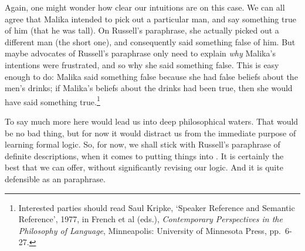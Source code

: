 Again, one might wonder how clear our intuitions are on this case. We can all agree that Malika intended to pick out a particular man, and say something true of him (that he was tall). On Russell's paraphrase, she actually picked out a different man (the short one), and consequently said something false of him. But  maybe advocates of Russell's paraphrase only need to explain \emph{why} Malika's intentions were frustrated, and so why she said something false. This is easy enough to do:  Malika said something false because she had false beliefs about the men's drinks; if Malika's beliefs about the drinks had been true,  then she would have said something true.\footnote{Interested parties should read Saul Kripke, `Speaker Reference and Semantic Reference', 1977, in French et al (eds.), \emph{Contemporary Perspectives in the Philosophy of Language}, Minneapolis: University of Minnesota Press, pp.\ 6-27.}

To say much more here would lead us into deep philosophical waters. That would be no bad thing, but for now it would distract us from the immediate purpose of learning formal logic. So, for now, we shall stick with Russell's paraphrase of definite descriptions, when it comes to putting things into \FOL. It is certainly the best that we can offer, without significantly revising our logic. And it is quite defensible as an paraphrase. 



\practiceproblems

